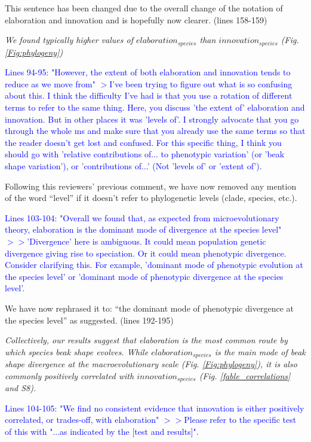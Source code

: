 \documentclass[12pt,letterpaper]{article}
\begin{document}
{This sentence has been changed due to the overall change of the notation of elaboration and innovation and is hopefully now clearer. (lines 158-159)

\noindent\textit{We found typically higher values of $elaboration_{species}$ than $innovation_{species}$ (Fig. \ref{Fig:phylogeny}) %
}

\textcolor{blue}{Lines 94-95: "However, the extent of both elaboration and innovation tends to reduce as we move from"
$>$I've been trying to figure out what is so confusing about this. I think the difficulty I've had is that you use a rotation of different terms to refer to the same thing. Here, you discuss 'the extent of' elaboration and innovation. But in other places it was 'levels of'. I strongly advocate that you go through the whole ms and make sure that you already use the same terms so that the reader doesn't get lost and confused. For this specific thing, I think you should go with 'relative contributions of... to phenotypic variation' (or 'beak shape variation'), or 'contributions of...' (Not 'levels of' or 'extent of').}

Following this reviewers’ previous comment, we have now removed any mention of the word “level” if it doesn’t refer to phylogenetic levels (clade, species, etc.).


\textcolor{blue}{Lines 103-104: "Overall we found that, as expected from microevolutionary theory, elaboration is the dominant mode of divergence at the species level"
$>>$'Divergence' here is ambiguous. It could mean population genetic divergence giving rise to speciation. Or it could mean phenotypic divergence. Consider clarifying this. For example, 'dominant mode of phenotypic evolution at the species level' or 'dominant mode of phenotypic divergence at the species level'.}

We have now rephrased it to: “the dominant mode of phenotypic divergence at the species level” as suggested. (lines 192-195)

\noindent\textit{Collectively, our results suggest that elaboration is the most common route by which species beak shape evolves.
While $elaboration_{species}$ is the main mode of beak shape divergence at the macroevolutionary scale %
(Fig. \ref{Fig:phylogeny}), it is also commonly positively correlated with $innovation_{species}$ (Fig. \ref{fable_correlations} and S8).} %

\textcolor{blue}{Lines 104-105: "We find no consistent evidence that innovation is either positively correlated, or trades-off, with elaboration"
$>>$Please refer to the specific test of this with "...as indicated by the [test and results]".}

}
\end{document}
